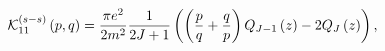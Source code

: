 \begin{equation}
\mathcal{K}_{11}^{\left( s-s\right) }\left( p,q\right) =\frac{\pi e^{2}}{%
2m^{2}}\frac{1}{2J+1}\left( \left( \frac{p}{q}+\frac{q}{p}\right)
Q_{J-1}\left( z\right) -2Q_{J}\left( z\right) \right) ,
\end{equation}


